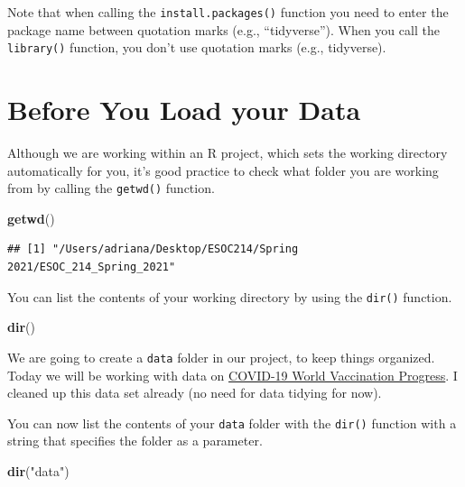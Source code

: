 \documentclass[
]{book}
\newenvironment{Shaded}{\begin{snugshade}}{\end{snugshade}}
\newcommand{\KeywordTok}[1]{\textcolor[rgb]{0.13,0.29,0.53}{\textbf{#1}}}
\newcommand{\NormalTok}[1]{#1}
\newcommand{\StringTok}[1]{\textcolor[rgb]{0.31,0.60,0.02}{#1}}
\begin{document}
Note that when calling the \texttt{install.packages()} function you need to enter the package name between quotation marks (e.g., ``tidyverse''). When you call the \texttt{library()} function, you don't use quotation marks (e.g., tidyverse).

\hypertarget{before-you-load-your-data}{%
\section{Before You Load your Data}\label{before-you-load-your-data}}

Although we are working within an R project, which sets the working directory automatically for you, it's good practice to check what folder you are working from by calling the \texttt{getwd()} function.

\begin{Shaded}
\begin{Highlighting}[]
\KeywordTok{getwd}\NormalTok{()}
\end{Highlighting}
\end{Shaded}

\begin{verbatim}
## [1] "/Users/adriana/Desktop/ESOC214/Spring 2021/ESOC_214_Spring_2021"
\end{verbatim}

You can list the contents of your working directory by using the \texttt{dir()} function.

\begin{Shaded}
\begin{Highlighting}[]
\KeywordTok{dir}\NormalTok{()}
\end{Highlighting}
\end{Shaded}

We are going to create a \texttt{data} folder in our project, to keep things organized. Today we will be working with data on \href{https://www.kaggle.com/gpreda/covid-world-vaccination-progress}{COVID-19 World Vaccination Progress}. I cleaned up this data set already (no need for data tidying for now).

You can now list the contents of your \texttt{data} folder with the \texttt{dir()} function with a string that specifies the folder as a parameter.

\begin{Shaded}
\begin{Highlighting}[]
\KeywordTok{dir}\NormalTok{(}\StringTok{"data"}\NormalTok{)}
\end{Highlighting}
\end{Shaded}
\end{document}

